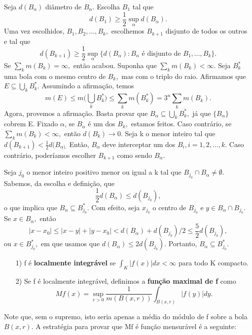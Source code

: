 \documentclass[MeasureTheory/measure_theory.tex]{subfiles}
\begin{document}
\begin{proof*}
	Seja \(d(B_{\alpha })\) diâmetro de \(B_{\alpha }.\) Escolha \(B_1\) tal que
	\[
		d(B_{1}) \geq \frac{1}{2}\sup_{\alpha }d(B_{\alpha }).
	\]
	Uma vez escolhidos, \(B_1, B_2, \dotsc , B_{k},\) escolhemos \(B_{k+1}\) disjunto de todos os outros e tal que
	\[
		d(B_{k+1}) \geq \frac{1}{2}\sup_{\alpha }\{d(B_{\alpha }): B_{\alpha } \text{ é disjunto de }B_1,\dotsc ,B_{k}\}.
	\]
	Se \(\sum\limits_{k}^{}m(B_{k}) = \infty,\) então acabou. Suponha que \(\sum\limits_{k}^{}m(B_{k}) < \infty\). Seja \(B_{k}^{*}\) uma bola com o mesmo centro de \(B_{k},\) mas com o triplo do raio. Afirmamos que
	\(E\subseteq \bigcup_{k}^{}B_{k}^{*}\). Assumindo a afirmação, temos
	\[
		m(E) \leq m \biggl(\bigcup_{k}^{}B_{k}^{*}\biggr) \leq \sum\limits_{k}^{}m(B_{k}^{*}) = 3^{n}\sum\limits_{k}^{}m(B_{k}).
	\]
	Agora, provemos a afirmação. Basta provar que \(B_{\alpha }\subseteq \bigcup_{k}^{}B_{k}^{*}, \) já que \(\{B_{\alpha }\}\) cobrem E. Fixado \(\alpha \), se \(B_{\alpha }\) é um dos \(B_{k},\) estamos feitos. Caso contrário,
	se \(\sum\limits_{k}^{}m(B_{k}) < \infty,\) então \(d(B_{k})\to 0\). Seja k o menor inteiro tal que \(d(B_{k+1}) < \frac{1}{2}d(B_{\alpha ).}\) Então, \(B_{\alpha }\) deve interceptar um dos \(B_{i}, i = 1, 2, \dotsc, k\). Caso contrário, poderíamos escolher \(B_{k+1}\) como sendo \(B_{\alpha }.\)

	Seja \(j_{0}\) o menor inteiro positivo menor ou igual a k tal que \(B_{j_{0}}\cap B_{\alpha }\neq\emptyset.\) Sabemos, da escolha e definição, que
	\[
		\frac{1}{2}d(B_{\alpha }) \leq d(B_{j_{0}}),
	\]
	o que implica que \(B_{\alpha }\subseteq B_{j_{0}}^{*}\). Com efeito, seja \(x_{j_{0}}\) o centro de \(B_{j_{0}}\) e \(y\in B_{\alpha }\cap B_{j_{0}}.\) Se \(x\in B_{\alpha},\) então
	\[
		|x-x_{0}|\leq |x-y| + |y-x_{0}| < d(B_{\alpha }) + d(B_{j_{0}})/2 \leq \frac{5}{2}d(B_{j_{0}}),
	\]
	ou \(x\in B_{j_{0}}^{*},\) em que usamos que \(d(B_\alpha ) \leq 2d(B_{j_{0}}).\) Portanto, \(B_{\alpha }\subseteq B_{j_{0}}^{*}.\) \qedsymbol
\end{proof*}
\begin{def*}
	\begin{itemize}
		\item[1)] f é \textbf{localmente integrável} se \(\int_{K}|f(x)| dx < \infty\) para todo K compacto.
		\item[2)] Se f é localmente integrável, definimos a \textbf{função maximal de f} como
		      \[
			      Mf(x) = \sup_{r > 0}\frac{1}{m(B(x, r))}\int_{B(x, r)}|f(y)| dy.
		      \]
	\end{itemize}
\end{def*}
Note que, sem o supremo, isto seria apenas a média do módulo de f sobre a bola \(B(x, r).\) A estratégia para provar que Mf é função mensurável é a seguinte:
\end{document}
